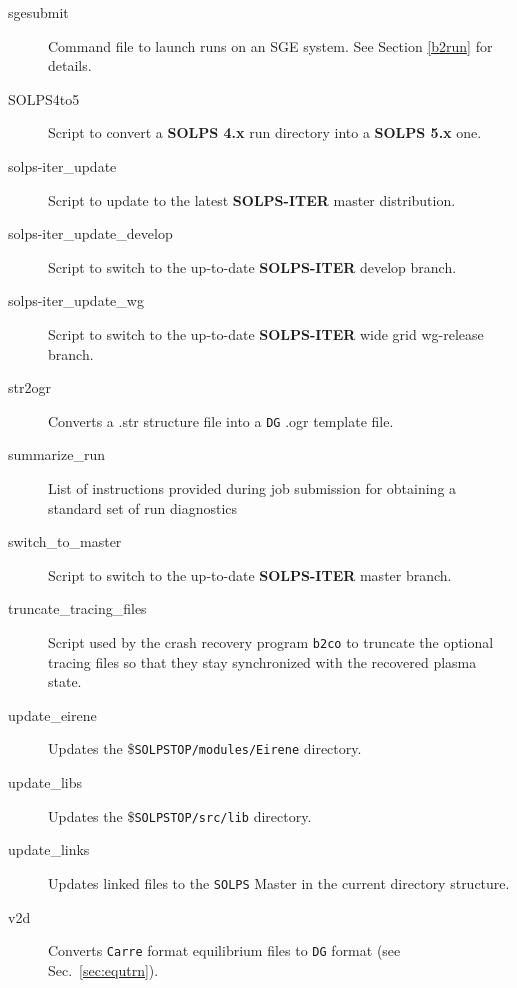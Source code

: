 \documentclass[a4paper,10pt]{report}
\newcommand\SOLPSfour{{\bf SOLPS 4.x} }
\newcommand\SOLPSfive{{\bf SOLPS 5.x} }
\newcommand\SOLPSITER{{\bf SOLPS-ITER} }
\begin{document}
\begin{itemize}
\begin{description}
  \item[sgesubmit] Command file to launch runs on an SGE system. See Section \ref{b2run} for details.
  \item[SOLPS4to5] Script to convert a \SOLPSfour run directory into a \SOLPSfive one.
  \item[solps-iter\_update] Script to update to the latest \SOLPSITER master distribution.
  \item[solps-iter\_update\_develop] Script to switch to the up-to-date \SOLPSITER develop branch.
  \item[solps-iter\_update\_wg] Script to switch to the up-to-date \SOLPSITER wide grid wg-release branch.
  \item[str2ogr] Converts a .str structure file into a {\tt DG} .ogr template file.
  \item[summarize\_run] List of instructions provided during job submission for obtaining a standard set of run diagnostics
  \item[switch\_to\_master] Script to switch to the up-to-date \SOLPSITER master branch.
  \item[truncate\_tracing\_files] Script used by the crash recovery program {\tt b2co} to truncate the optional tracing files so that they stay synchronized with the recovered plasma state.
  \item[update\_eirene] Updates the \${\tt SOLPSTOP/modules/Eirene} directory.
  \item[update\_libs] Updates the \${\tt SOLPSTOP/src/lib} directory.
  \item[update\_links] Updates linked files to the {\tt SOLPS} Master in the current directory structure.
  \item[v2d] Converts {\tt Carre} format equilibrium files to {\tt DG} format (see Sec.~\ref{sec:equtrn}).
  \end{description}
\end{itemize}
\end{document}
